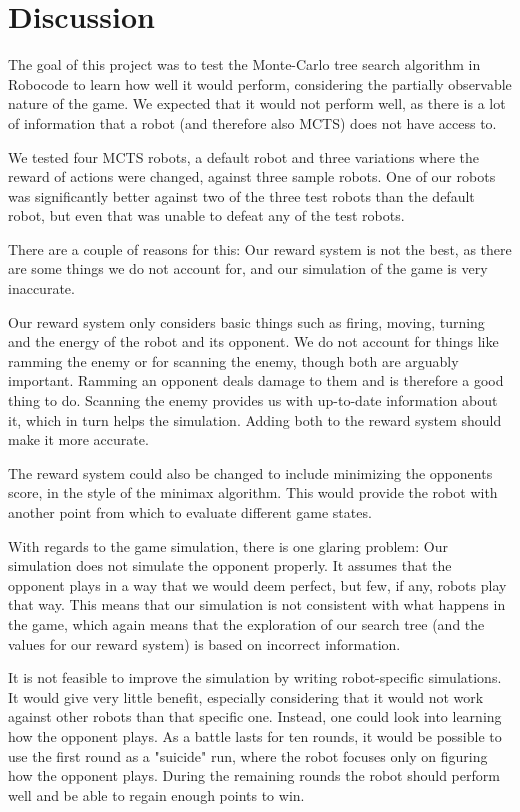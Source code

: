 \section{Discussion}
\label{06}

The goal of this project was to test the Monte-Carlo tree search algorithm in Robocode to learn how well it would perform, considering the partially observable nature of the game. We expected that it would not perform well, as there is a lot of information that a robot (and therefore also MCTS) does not have access to.

We tested four MCTS robots, a default robot and three variations where the reward of actions were changed, against three sample robots. One of our robots was significantly better against two of the three test robots than the default robot, but even that was unable to defeat any of the test robots.

There are a couple of reasons for this: Our reward system is not the best, as there are some things we do not account for, and our simulation of the game is very inaccurate.

Our reward system only considers basic things such as firing, moving, turning and the energy of the robot and its opponent. We do not account for things like ramming the enemy or for scanning the enemy, though both are arguably important. Ramming an opponent deals damage to them and is therefore a good thing to do. Scanning the enemy provides us with up-to-date information about it, which in turn helps the simulation. Adding both to the reward system should make it more accurate.

The reward system could also be changed to include minimizing the opponents score, in the style of the minimax algorithm. This would provide the robot with another point from which to evaluate different game states.

With regards to the game simulation, there is one glaring problem: Our simulation does not simulate the opponent properly. It assumes that the opponent plays in a way that we would deem perfect, but few, if any, robots play that way. This means that our simulation is not consistent with what happens in the game, which again means that the exploration of our search tree (and the values for our reward system) is based on incorrect information.

It is not feasible to improve the simulation by writing robot-specific simulations. It would give very little benefit, especially considering that it would not work against other robots than that specific one. Instead, one could look into learning how the opponent plays. As a battle lasts for ten rounds, it would be possible to use the first round as a "suicide" run, where the robot focuses only on figuring how the opponent plays. During the remaining rounds the robot should perform well and be able to regain enough points to win.

